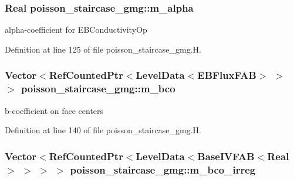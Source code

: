 \subsubsection[{\texorpdfstring{m\+\_\+alpha}{m_alpha}}]{\setlength{\rightskip}{0pt plus 5cm}Real poisson\+\_\+staircase\+\_\+gmg\+::m\+\_\+alpha\hspace{0.3cm}{\ttfamily [protected]}}\hypertarget{classpoisson__staircase__gmg_a693bc415824ca16c316da68a5d49e908}{}\label{classpoisson__staircase__gmg_a693bc415824ca16c316da68a5d49e908}


alpha-\/coefficient for E\+B\+Conductivity\+Op 



Definition at line 125 of file poisson\+\_\+staircase\+\_\+gmg.\+H.

\subsubsection[{\texorpdfstring{m\+\_\+bco}{m_bco}}]{\setlength{\rightskip}{0pt plus 5cm}Vector$<$Ref\+Counted\+Ptr$<$Level\+Data$<$E\+B\+Flux\+F\+AB$>$ $>$ $>$ poisson\+\_\+staircase\+\_\+gmg\+::m\+\_\+bco\hspace{0.3cm}{\ttfamily [protected]}}\hypertarget{classpoisson__staircase__gmg_a9e2cb700c8b327765f39297acad466c8}{}\label{classpoisson__staircase__gmg_a9e2cb700c8b327765f39297acad466c8}


b-\/coefficient on face centers 



Definition at line 140 of file poisson\+\_\+staircase\+\_\+gmg.\+H.

\subsubsection[{\texorpdfstring{m\+\_\+bco\+\_\+irreg}{m_bco_irreg}}]{\setlength{\rightskip}{0pt plus 5cm}Vector$<$Ref\+Counted\+Ptr$<$Level\+Data$<$Base\+I\+V\+F\+AB$<$Real$>$ $>$ $>$ $>$ poisson\+\_\+staircase\+\_\+gmg\+::m\+\_\+bco\+\_\+irreg\hspace{0.3cm}{\ttfamily [protected]}}\hypertarget{classpoisson__staircase__gmg_a6c24e1d569a22ce6114b94261ca1b017}{}\label{classpoisson__staircase__gmg_a6c24e1d569a22ce6114b94261ca1b017}



